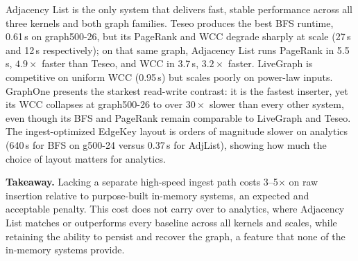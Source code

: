 \project{} Adjacency List is the only system that delivers fast, stable performance across all three kernels and both graph families.
Teseo produces the best BFS runtime, 0.61\,s on graph500-26, but its PageRank and WCC degrade sharply at scale (27\,s and 12\,s respectively); on that same graph, \project{} Adjacency List runs PageRank in 5.5\,s, $4.9\times$ faster than Teseo, and WCC in 3.7\,s, $3.2\times$ faster.
LiveGraph is competitive on uniform WCC (0.95\,s) but scales poorly on power-law inputs.
GraphOne presents the starkest read-write contrast: it is the fastest inserter, yet its WCC collapses at graph500-26 to over $30\times$ slower than every other system, even though its BFS and PageRank remain comparable to LiveGraph and Teseo.
The ingest-optimized EdgeKey layout is orders of magnitude slower on analytics (640\,s for BFS on g500-24 versus 0.37\,s for AdjList), showing how much the choice of layout matters for analytics.

\textbf{Takeaway.}
Lacking a separate high-speed ingest path costs \project{} 3--5$\times$ on raw insertion relative to purpose-built in-memory systems, an expected and acceptable penalty.
This cost does not carry over to analytics, where \project{} Adjacency List matches or outperforms every baseline across all kernels and scales, while retaining the ability to persist and recover the graph, a feature that none of the in-memory systems provide.